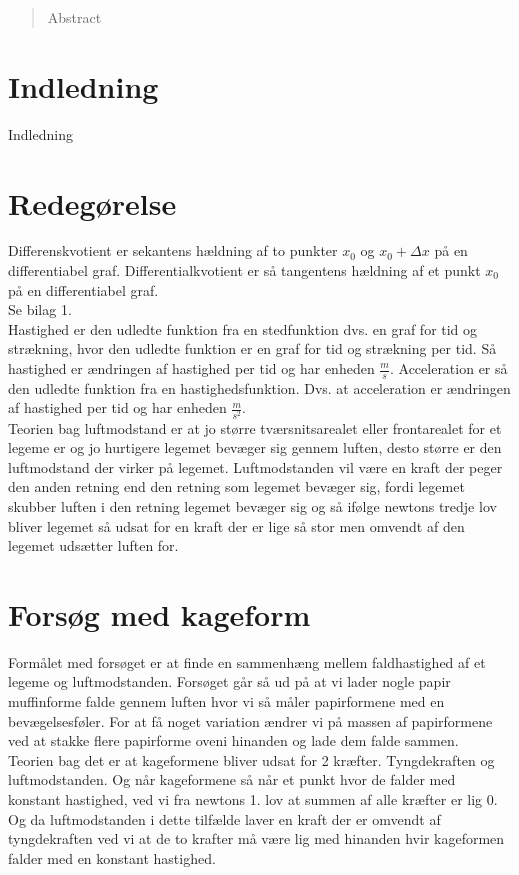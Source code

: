 \documentclass[12pt]{article}
\begin{document}
\begin{abstract}
Abstract
\end{abstract}
\pagebreak

\tableofcontents
\pagebreak

\section{Indledning}
Indledning

\section{Redegørelse}
Differenskvotient er sekantens hældning af to punkter $x_{0}$ og $x_{0}+\Delta x$ på en differentiabel graf.
Differentialkvotient er så tangentens hældning af et punkt $x_{0}$ på en differentiabel graf.\\
Se bilag 1.\\
Hastighed er den udledte funktion fra en stedfunktion dvs. en graf for tid og strækning, hvor den udledte funktion er en graf for tid og strækning per tid. Så hastighed er ændringen af hastighed per tid og har enheden $\frac{m}{s}$.
Acceleration er så den udledte funktion fra en hastighedsfunktion. Dvs. at acceleration er ændringen af hastighed per tid og har enheden $\frac{m}{s^2}$.\\
Teorien bag luftmodstand er at jo større tværsnitsarealet eller frontarealet for et legeme er og jo hurtigere legemet bevæger sig gennem luften, desto større er den luftmodstand der virker på legemet. Luftmodstanden vil være en kraft der peger den anden retning end den retning som legemet bevæger sig,
fordi legemet skubber luften i den retning legemet bevæger sig og så ifølge newtons tredje lov bliver legemet så udsat for en kraft der er lige så stor men omvendt af den legemet udsætter luften for.


\section{Forsøg med kageform}
Formålet med forsøget er at finde en sammenhæng mellem faldhastighed af et legeme og luftmodstanden. Forsøget går så ud på at vi lader nogle papir muffinforme falde gennem luften
hvor vi så måler papirformene med en bevægelsesføler. For at få noget variation ændrer vi på massen af papirformene ved at stakke flere papirforme oveni hinanden og lade dem falde sammen.\\
Teorien bag det er at kageformene bliver udsat for 2 kræfter. Tyngdekraften og luftmodstanden. Og når kageformene så når et punkt hvor de falder med konstant hastighed, ved vi fra newtons 1. lov
at summen af alle kræfter er lig 0. Og da luftmodstanden i dette tilfælde laver en kraft der er omvendt af tyngdekraften ved vi at de to krafter må være lig med hinanden hvir kageformen falder med
en konstant hastighed.
\end{document}

